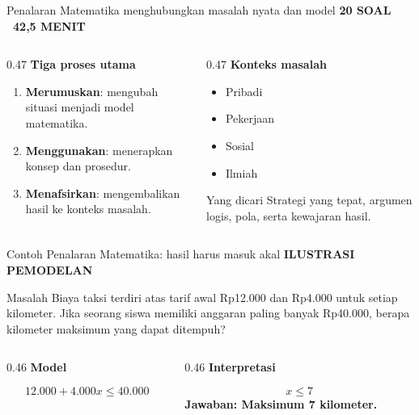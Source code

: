 \documentclass[aspectratio=169,11pt]{beamer}
\newcommand{\kicker}[1]{%
  {\color{StudentCyan}\bfseries\fontsize{10.5}{13}\selectfont\MakeUppercase{#1}}\par\vspace{0.11cm}
}
\newcommand{\answer}[1]{%
  \vspace{0.10cm}
  {\color{StudentGreen}\bfseries\fontsize{11.5}{14}\selectfont Jawaban: #1}
}
\begin{document}
\begin{frame}{Penalaran Matematika menghubungkan masalah nyata dan model}
  \kicker{20 Soal \textbar\ 42,5 Menit}
  \begin{columns}[T,onlytextwidth]
    \begin{column}{0.47\textwidth}
      {\color{StudentBlue}\bfseries Tiga proses utama}\par
      \begin{enumerate}
        \item \textbf{Merumuskan}: mengubah situasi menjadi model matematika.
        \item \textbf{Menggunakan}: menerapkan konsep dan prosedur.
        \item \textbf{Menafsirkan}: mengembalikan hasil ke konteks masalah.
      \end{enumerate}
    \end{column}
    \begin{column}{0.47\textwidth}
      {\color{StudentBlue}\bfseries Konteks masalah}\par
      \begin{itemize}
        \item Pribadi
        \item Pekerjaan
        \item Sosial
        \item Ilmiah
      \end{itemize}
      \begin{block}{Yang dicari}
        Strategi yang tepat, argumen logis, pola, serta kewajaran hasil.
      \end{block}
    \end{column}
  \end{columns}
\end{frame}

\begin{frame}{Contoh Penalaran Matematika: hasil harus masuk akal}
  \kicker{Ilustrasi Pemodelan}
  \begin{block}{Masalah}
    Biaya taksi terdiri atas tarif awal Rp12.000 dan Rp4.000 untuk setiap kilometer. Jika seorang siswa memiliki anggaran paling banyak Rp40.000, berapa kilometer maksimum yang dapat ditempuh?
  \end{block}
  \vspace{0.15cm}
  \begin{columns}[T,onlytextwidth]
    \begin{column}{0.46\textwidth}
      {\color{StudentBlue}\bfseries Model}\par
      \[
        12.000 + 4.000x \leq 40.000
      \]
    \end{column}
    \begin{column}{0.46\textwidth}
      {\color{StudentBlue}\bfseries Interpretasi}\par
      \[
        x \leq 7
      \]
      \answer{Maksimum 7 kilometer.}
    \end{column}
  \end{columns}
\end{frame}
\end{document}
